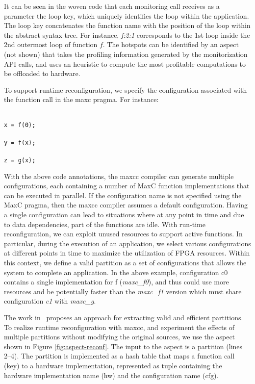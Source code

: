 \noindent It can be seen in the woven code that each monitoring call receives as a parameter the loop key, which uniquely identifies the loop within the application. The loop key concatenates the function name with the position of the loop within the abstract syntax tree. For instance, \emph{f:2:1} corresponds to the 1st loop inside the 2nd outermost loop of function $f$. The hotspots can be identified by an aspect (not shown) that takes the profiling information generated by the monitorization API calls, and uses an heuristic to compute the most profitable computations to be offloaded to hardware.

To support runtime reconfiguration, we specify the configuration associated with the function call in the maxc pragma. For instance:

\noindent\texttt{\footnotesize{\\
x = f(0); \\
\\
y = f(x); \\
\\
z = g(x); \\
}}

\noindent With the above code annotations, the maxcc compiler can generate multiple configurations, each containing  a number of MaxC function implementations that can be executed in parallel. If the configuration name is not specified using the MaxC pragma, then the maxcc compiler assumes a default configuration. Having a single configuration can lead to situations where at any point in time and due to data dependencies, part of the functions are idle. With run-time reconfiguration, we can exploit unused resources to support active functions. In particular, during the execution of an application, we select various configurations at different points in time to maximize the utilization of FPGA resources. Within this context, we define a valid partition as a set of configurations that allows the system to complete an application. In the above example, configuration c0 contains a single implementation for f (\emph{maxc\_f0}), and thus could use more resources and be potentially faster than the \emph{maxc\_f1} version which must share configuration \emph{c1} with \emph{maxc\_g}.

The work in~\cite{Xinyu:Qiwei:Luk:Qiang:Pell:2012} proposes an
approach for extracting valid and efficient partitions. To realize
runtime reconfiguration with maxcc, and experiment the effects of
multiple partitions without modifying the original sources, we use the
aspect shown in Figure \ref{fig:aspect-reconf}.  The input to the
aspect is a partition (lines 2--4). The partition is implemented as a
hash table that maps a function call (key) to a hardware
implementation, represented as tuple containing the hardware
implementation name (hw) and the configuration name (cfg).

